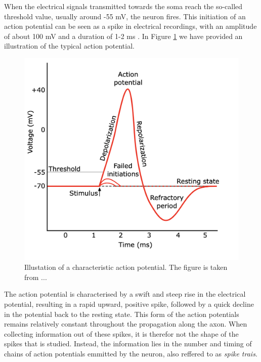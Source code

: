 \documentclass[a4paper, UKenglish, 11pt]{uiomaster}
\begin{document}
When the electrical signals transmitted towards the soma reach the so-called threshold value, usually around -55 mV, the neuron fires. This initiation of an action potential can be seen as a spike in electrical recordings, with an amplitude of about 100 mV and a duration of 1-2 ms \cite{gerstner2014neuronal}. In Figure \ref{fig:action_potential} we have provided an illustration of the typical action potential.


\begin{figure}
    \centering
    \includegraphics[width=0.8\linewidth]{figures/action_potential.png}
    \caption{Illustation of a characteristic action potential. The figure is taken from ... }
    \label{fig:action_potential}
\end{figure}

The action potential is characterised by a swift and steep rise in the electrical potential, resulting in a rapid upward, positive spike, followed by a quick decline in the potential back to the resting state. This form of the action potentials remains relatively constant throughout the propagation along the axon. When collecting information out of these spikes, it is therefor not the shape of the spikes that is studied. Instead, the information lies in the number and timing of chains of action potentials emmitted by the neuron, also reffered to as \emph{spike trais}.
\end{document}
